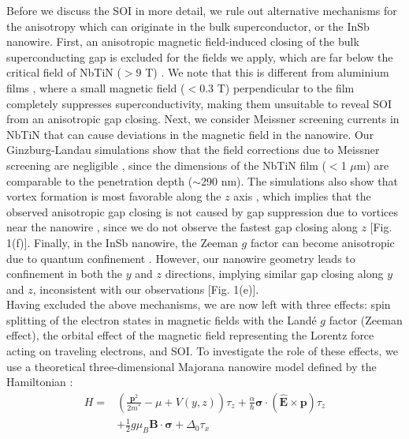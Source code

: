 Before we discuss the SOI in more detail, we rule out alternative mechanisms for the anisotropy which can originate in the bulk superconductor, or the InSb nanowire. First, an anisotropic magnetic field-induced closing of the bulk superconducting gap is excluded for the fields we apply, which are far below the critical field of NbTiN ($>$9 T) \cite{DavidOneMin}. We note that this is different from aluminium films \cite{Chang2015,Deng2016,Gazibegovic2017,QZBP}, where a small magnetic field ($<$0.3 T) perpendicular to the film completely suppresses superconductivity, making them unsuitable to reveal SOI from an anisotropic gap closing. Next, we consider Meissner screening currents in NbTiN that can cause deviations in the magnetic field in the nanowire. Our Ginzburg-Landau simulations show that the field corrections due to Meissner screening are negligible \cite{Note1}, since the dimensions of the NbTiN film ($<$1 $\mu$m) are comparable to the penetration depth ($\sim$290 nm). The simulations also show that vortex formation is most favorable along the $z$ axis \cite{Note1}, which implies that the observed anisotropic gap closing is not caused by gap suppression due to vortices near the nanowire \cite{Takei2013}, since we do not observe the fastest gap closing along $z$ [Fig. 1(f)]. Finally, in the InSb nanowire, the Zeeman $g$ factor can become anisotropic due to quantum confinement \cite{NadjPerge2012,Pryor2006,Qu2016}. However, our nanowire geometry leads to confinement in both the $y$ and $z$ directions, implying similar gap closing along $y$ and $z$, inconsistent with our observations [Fig. 1(e)].
\\ \indent
Having excluded the above mechanisms, we are now left with three effects: spin splitting of the electron \mbox{states} in magnetic fields with the Land\'e $g$ factor (Zeeman eff\mbox{ect)}, the orbital effect of the magnetic field representing the Lorentz force acting on traveling electrons, and SOI. To investigate the role of these effects, we use a theoretical three-dimensional Majorana nanowire model defined by the Hamiltonian \cite{Lutchyn2010,Oreg2010,Nijholt2016}:
\begin{equation*}
\begin{split}
H = &\left(\frac{\mathbf{p}^2}{2m^*}-\mu+V(y,z)\right) \tau_z + \frac{\alpha}{\hbar} \boldsymbol{\sigma} \cdot \mathbf{(\hat{E}\times p)} \tau_z\\
&+ \frac{1}{2}g\mu_B\mathbf{B\cdot}\boldsymbol{\sigma}+\Delta_0 \tau_x
\end{split}
\end{equation*}
